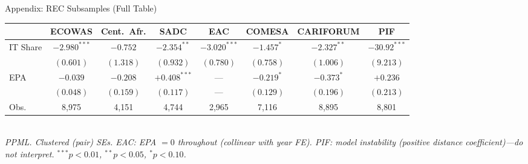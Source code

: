 \documentclass[aspectratio=169,11pt]{beamer}
\begin{document}
\begin{frame}{Appendix: REC Subsamples (Full Table)}
    {\tiny
    \begin{tabular}{lccccccc}
        \toprule
        & ECOWAS & Cent.\ Afr. & SADC & EAC & COMESA & CARIFORUM & PIF \\
        \midrule
        IT Share
          & $-2.980^{***}$ & $-0.752$ & $-2.354^{**}$ & $-3.020^{***}$
          & $-1.457^{*}$ & $-2.327^{**}$ & $-30.92^{***}$ \\
          & $(0.601)$ & $(1.318)$ & $(0.932)$ & $(0.780)$
          & $(0.758)$ & $(1.006)$ & $(9.213)$ \\[2pt]
        EPA
          & $-0.039$ & $-0.208$ & $+0.408^{***}$ & ---
          & $-0.219^{*}$ & $-0.373^{*}$ & $+0.236$ \\
          & $(0.048)$ & $(0.159)$ & $(0.117)$ & ---
          & $(0.129)$ & $(0.196)$ & $(0.213)$ \\
        \midrule
        Obs.
          & 8,975 & 4,151 & 4,744 & 2,965 & 7,116 & 8,895 & 8,801 \\
        \bottomrule
    \end{tabular}}
    \vspace{0.1cm}\\
    \tiny\textit{PPML. Clustered (pair) SEs.
    EAC: EPA $= 0$ throughout (collinear with year FE).
    PIF: model instability (positive distance coefficient)---do not interpret.
    $^{***}p{<}0.01$, $^{**}p{<}0.05$, $^{*}p{<}0.10$.}
\end{frame}
\end{document}
